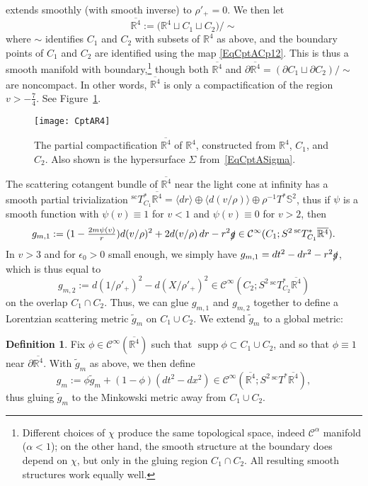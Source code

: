 \documentclass[reqno,11pt,letterpaper]{amsart}
\numberwithin{equation}{section}
\numberwithin{figure}{section}
\theoremstyle{definition}
\newtheorem{definition}[thm]{Definition}
\theoremstyle{remark}
\newcommand{\mc}{\mathcal}
\newcommand{\cC}{\mc C}
\newcommand{\R}{\mathbb{R}}
\newcommand{\Sph}{\mathbb{S}}
\newcommand{\slg}{\slashed{g}{}}
\newcommand{\supp}{\operatorname{supp}}
\newcommand{\eps}{\epsilon}
\newcommand{\la}{\langle}
\newcommand{\ol}{\overline}
\newcommand{\pa}{\partial}
\newcommand{\ra}{\rangle}
\newcommand{\wt}{\widetilde}
\newcommand{\scl}{{\mathrm{sc}}}
\newcommand{\Tsc}{{}^{\scl}T}
\newcommand{\CI}{\cC^\infty}
\begin{document}
extends smoothly (with smooth inverse) to $\rho'_+=0$. We then let
\[
  \ol{\R^4} := \bigl( \R^4 \sqcup C_1 \sqcup C_2 \bigr) / \sim
\]
where $\sim$ identifies $C_1$ and $C_2$ with subsets of $\R^4$ as above, and the boundary points of $C_1$ and $C_2$ are identified using the map \eqref{EqCptACp12}. This is thus a smooth manifold with boundary,\footnote{Different choices of $\chi$ produce the same topological space, indeed $\cC^\alpha$ manifold ($\alpha<1$); on the other hand, the smooth structure at the boundary does depend on $\chi$, but only in the gluing region $C_1\cap C_2$. All resulting smooth structures work equally well.} though both $\ol{\R^4}$ and $\pa{\ol{\R^4}}=(\pa C_1\sqcup\pa C_2)/\sim$ are noncompact. In other words, $\ol{\R^4}$ is only a compactification of the region $v>-\tfrac74$. See Figure~\ref{FigCptAR4}.

\begin{figure}[!ht]
\texttt{[image: CptAR4]}
\caption{The partial compactification $\ol{\R^4}$ of $\R^4$, constructed from $\R^4$, $C_1$, and $C_2$. Also shown is the hypersurface $\Sigma$ from~\eqref{EqCptASigma}.}
\label{FigCptAR4}
\end{figure}

The scattering cotangent bundle of $\ol{\R^4}$ near the light cone at infinity has a smooth partial trivialization $\Tsc^*_{C_1}\ol{\R^4}=\la dr\ra \oplus \la d(v/\rho)\ra \oplus \rho^{-1}T^*\Sph^2$, thus if $\psi$ is a smooth function with $\psi(v)\equiv 1$ for $v<1$ and $\psi(v)\equiv 0$ for $v>2$, then
\begin{equation}
\label{EqCptAMetric1}
  g_{m,1} := (1-\tfrac{2 m \psi(v)}{r})d(v/\rho)^2 + 2 d(v/\rho)\,dr - r^2\slg \in \CI(C_1;S^2\,\Tsc^*_{C_1}\ol{\R^4}).
\end{equation}
In $v>3$ and for $\eps_0>0$ small enough, we simply have $g_{m,1}=dt^2-dr^2-r^2\slg$, which is thus equal to
\[
  g_{m,2} := d(1/\rho'_+)^2 - d(X/\rho'_+)^2 \in \CI(C_2;S^2\,\Tsc^*_{C_2}\ol{\R^4})
\]
on the overlap $C_1\cap C_2$. Thus, we can glue $g_{m,1}$ and $g_{m,2}$ together to define a Lorentzian scattering metric $\wt g_m$ on $C_1\cup C_2$. We extend $\wt g_m$ to a global metric:

\begin{definition}
\label{DefCptAMetric}
  Fix $\phi\in\CI(\ol{\R^4})$ such that $\supp\phi\subset C_1\cup C_2$, and so that $\phi\equiv 1$ near $\pa\ol{\R^4}$. With $\tilde g_m$ as above, we then define
  \begin{equation}
  \label{EqCptAMetric}
    g_m := \phi\wt g_m + (1-\phi)(dt^2-dx^2) \in \CI(\ol{\R^4};S^2\,\Tsc^*\ol{\R^4}),
  \end{equation}
  thus gluing $\wt g_m$ to the Minkowski metric away from $C_1\cup C_2$.
\end{definition}
\end{document}
